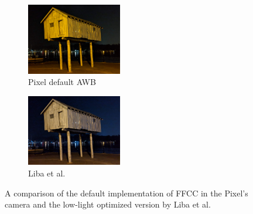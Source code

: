 \documentclass{sig-alternate}
\begin{document}
\begin{figure}
\centering
\begin{subfigure}{9.8pc}
\centering
\includegraphics[width=9.8pc]{figures/0GMA_20180814_233948_174_qc.jpg}
\caption{Pixel default AWB}
\label{fig:whitebalance:default}
\end{subfigure}
\begin{subfigure}{9.8pc}
\centering
\includegraphics[width=9.8pc]{figures/0GMA_20180814_233948_174_gcam.jpg}
\caption{Liba et al.}
\label{fig:whitebalance:liba}
\end{subfigure}

\caption{A comparison of the default implementation of FFCC in the Pixel's camera and the low-light optimized version by Liba et al.~\cite{blog:Levoy2018}}


\label{fig:whitebalance}
\end{figure}
\end{document}

